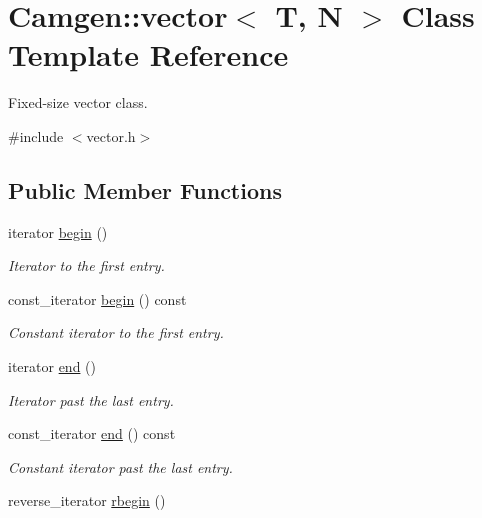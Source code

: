 \hypertarget{a00559}{\section{Camgen\-:\-:vector$<$ T, N $>$ Class Template Reference}
\label{a00559}
}


Fixed-\/size vector class.  




{\ttfamily \#include $<$vector.\-h$>$}

\subsection*{Public Member Functions}
\begin{DoxyCompactItemize}
\item 
\hypertarget{a00559_a9f8c68bcf6968d27858dc0d77084085d}{iterator \hyperlink{a00559_a9f8c68bcf6968d27858dc0d77084085d}{begin} ()}\label{a00559_a9f8c68bcf6968d27858dc0d77084085d}

\begin{DoxyCompactList}\small\item\em Iterator to the first entry. \end{DoxyCompactList}\item 
\hypertarget{a00559_a82a835a5610044d013b21394104a4039}{const\-\_\-iterator \hyperlink{a00559_a82a835a5610044d013b21394104a4039}{begin} () const }\label{a00559_a82a835a5610044d013b21394104a4039}

\begin{DoxyCompactList}\small\item\em Constant iterator to the first entry. \end{DoxyCompactList}\item 
\hypertarget{a00559_ae7a9267eaa5dfda5a687363d3b16572e}{iterator \hyperlink{a00559_ae7a9267eaa5dfda5a687363d3b16572e}{end} ()}\label{a00559_ae7a9267eaa5dfda5a687363d3b16572e}

\begin{DoxyCompactList}\small\item\em Iterator past the last entry. \end{DoxyCompactList}\item 
\hypertarget{a00559_aec7b8f730795653968b675230072edf2}{const\-\_\-iterator \hyperlink{a00559_aec7b8f730795653968b675230072edf2}{end} () const }\label{a00559_aec7b8f730795653968b675230072edf2}

\begin{DoxyCompactList}\small\item\em Constant iterator past the last entry. \end{DoxyCompactList}\item 
\hypertarget{a00559_ab2fbf02683447ce7cf3c940fa07407fc}{reverse\-\_\-iterator \hyperlink{a00559_ab2fbf02683447ce7cf3c940fa07407fc}{rbegin} ()}\label{a00559_ab2fbf02683447ce7cf3c940fa07407fc}


\end{DoxyCompactItemize}
